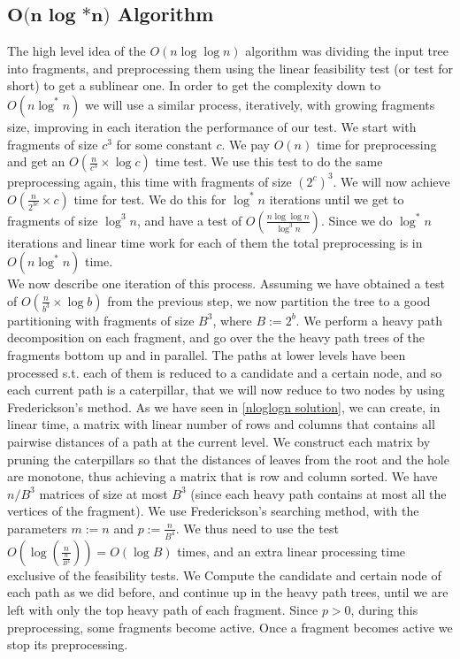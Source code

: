 \documentclass[11pt,a4paper]{article}
\theoremstyle{definition}
\theoremstyle{remark}
\begin{document}
\subsection{$\textbf{O(n log *n)}$ Algorithm}
The high level idea of the $O(n \log \log n)$ algorithm was dividing the input tree into fragments, and preprocessing them using the linear feasibility test (or test for short) to get a sublinear one. In order to get the complexity down to $O(n \log ^*n)$ we will use a similar process, iteratively, with growing fragments size, improving in each iteration the performance of our test.
We start with fragments of size $c^3$ for some constant $c$.
We pay $O(n)$ time for preprocessing and get an $O(\frac{n}{c^3} \times \log c)$ time test.
We use this test to do the same preprocessing again, this time with fragments of size $(2^c)^3$.
We will now achieve $O(\frac{n}{2^{3c}} \times c)$ time for test.
We do this for $\log ^*n$ iterations until we get to fragments of size $\log ^3n$, and have a test of $O(\frac{n \log \log n}{\log ^3n})$.
Since we do $\log ^*n$ iterations and linear time work for each of them the total preprocessing is in $O(n \log ^*n)$ time.\\
We now describe one iteration of this process.
Assuming we have obtained a test of $O(\frac{n}{b^3} \times \log b)$ from the previous step, we now partition the tree to a good partitioning with fragments of size $B^3$, where $B:=2^b$. We perform a heavy path decomposition on each fragment, and go over the the heavy path trees of the fragments bottom up and in parallel. The paths at lower levels have been processed s.t. each of them is reduced to a candidate and a certain node, and so each current path is a caterpillar, that we will now reduce to two nodes by using Frederickson's method. As we have seen in \ref{nloglogn solution}, we can create, in linear time, a matrix with linear number of rows and columns that contains all pairwise distances of a path at the current level. We construct each matrix by pruning the caterpillars so that the distances of leaves from the root and the hole are monotone, thus achieving a matrix that is row and column sorted. We have $n/B^3$ matrices of size at most $B^3$ (since each heavy path contains at most all the vertices of the fragment). We use Frederickson's searching method, with the parameters $m:=n$ and $p:=\frac{n}{B^4}$. We thus need to use the test $O(\log (\frac{n}{\frac{n}{B^4}}))=O(\log B)$ times, and an extra linear processing time exclusive of the feasibility tests. We Compute the candidate and certain node of each path as we did before, and continue up in the heavy path trees, until we are left with only the top heavy path of each fragment. Since $p>0$, during this preprocessing, some fragments become active. Once a fragment becomes active we stop its preprocessing.\\
\end{document}
